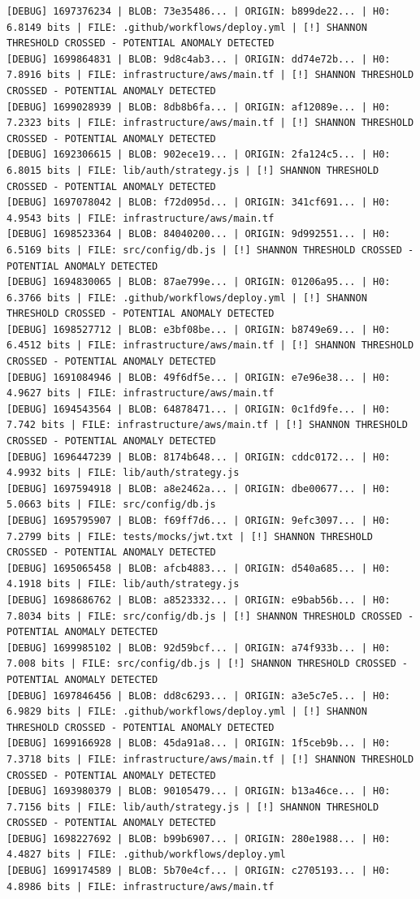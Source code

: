 \documentclass[12pt, a4paper, oneside]{report}
\begin{document}
\begin{lstlisting}[basicstyle=\tiny\ttfamily]
[DEBUG] 1697376234 | BLOB: 73e35486... | ORIGIN: b899de22... | H0: 6.8149 bits | FILE: .github/workflows/deploy.yml | [!] SHANNON THRESHOLD CROSSED - POTENTIAL ANOMALY DETECTED
[DEBUG] 1699864831 | BLOB: 9d8c4ab3... | ORIGIN: dd74e72b... | H0: 7.8916 bits | FILE: infrastructure/aws/main.tf | [!] SHANNON THRESHOLD CROSSED - POTENTIAL ANOMALY DETECTED
[DEBUG] 1699028939 | BLOB: 8db8b6fa... | ORIGIN: af12089e... | H0: 7.2323 bits | FILE: infrastructure/aws/main.tf | [!] SHANNON THRESHOLD CROSSED - POTENTIAL ANOMALY DETECTED
[DEBUG] 1692306615 | BLOB: 902ece19... | ORIGIN: 2fa124c5... | H0: 6.8015 bits | FILE: lib/auth/strategy.js | [!] SHANNON THRESHOLD CROSSED - POTENTIAL ANOMALY DETECTED
[DEBUG] 1697078042 | BLOB: f72d095d... | ORIGIN: 341cf691... | H0: 4.9543 bits | FILE: infrastructure/aws/main.tf
[DEBUG] 1698523364 | BLOB: 84040200... | ORIGIN: 9d992551... | H0: 6.5169 bits | FILE: src/config/db.js | [!] SHANNON THRESHOLD CROSSED - POTENTIAL ANOMALY DETECTED
[DEBUG] 1694830065 | BLOB: 87ae799e... | ORIGIN: 01206a95... | H0: 6.3766 bits | FILE: .github/workflows/deploy.yml | [!] SHANNON THRESHOLD CROSSED - POTENTIAL ANOMALY DETECTED
[DEBUG] 1698527712 | BLOB: e3bf08be... | ORIGIN: b8749e69... | H0: 6.4512 bits | FILE: infrastructure/aws/main.tf | [!] SHANNON THRESHOLD CROSSED - POTENTIAL ANOMALY DETECTED
[DEBUG] 1691084946 | BLOB: 49f6df5e... | ORIGIN: e7e96e38... | H0: 4.9627 bits | FILE: infrastructure/aws/main.tf
[DEBUG] 1694543564 | BLOB: 64878471... | ORIGIN: 0c1fd9fe... | H0: 7.742 bits | FILE: infrastructure/aws/main.tf | [!] SHANNON THRESHOLD CROSSED - POTENTIAL ANOMALY DETECTED
[DEBUG] 1696447239 | BLOB: 8174b648... | ORIGIN: cddc0172... | H0: 4.9932 bits | FILE: lib/auth/strategy.js
[DEBUG] 1697594918 | BLOB: a8e2462a... | ORIGIN: dbe00677... | H0: 5.0663 bits | FILE: src/config/db.js
[DEBUG] 1695795907 | BLOB: f69ff7d6... | ORIGIN: 9efc3097... | H0: 7.2799 bits | FILE: tests/mocks/jwt.txt | [!] SHANNON THRESHOLD CROSSED - POTENTIAL ANOMALY DETECTED
[DEBUG] 1695065458 | BLOB: afcb4883... | ORIGIN: d540a685... | H0: 4.1918 bits | FILE: lib/auth/strategy.js
[DEBUG] 1698686762 | BLOB: a8523332... | ORIGIN: e9bab56b... | H0: 7.8034 bits | FILE: src/config/db.js | [!] SHANNON THRESHOLD CROSSED - POTENTIAL ANOMALY DETECTED
[DEBUG] 1699985102 | BLOB: 92d59bcf... | ORIGIN: a74f933b... | H0: 7.008 bits | FILE: src/config/db.js | [!] SHANNON THRESHOLD CROSSED - POTENTIAL ANOMALY DETECTED
[DEBUG] 1697846456 | BLOB: dd8c6293... | ORIGIN: a3e5c7e5... | H0: 6.9829 bits | FILE: .github/workflows/deploy.yml | [!] SHANNON THRESHOLD CROSSED - POTENTIAL ANOMALY DETECTED
[DEBUG] 1699166928 | BLOB: 45da91a8... | ORIGIN: 1f5ceb9b... | H0: 7.3718 bits | FILE: infrastructure/aws/main.tf | [!] SHANNON THRESHOLD CROSSED - POTENTIAL ANOMALY DETECTED
[DEBUG] 1693980379 | BLOB: 90105479... | ORIGIN: b13a46ce... | H0: 7.7156 bits | FILE: lib/auth/strategy.js | [!] SHANNON THRESHOLD CROSSED - POTENTIAL ANOMALY DETECTED
[DEBUG] 1698227692 | BLOB: b99b6907... | ORIGIN: 280e1988... | H0: 4.4827 bits | FILE: .github/workflows/deploy.yml
[DEBUG] 1699174589 | BLOB: 5b70e4cf... | ORIGIN: c2705193... | H0: 4.8986 bits | FILE: infrastructure/aws/main.tf
\end{lstlisting}
\end{document}
